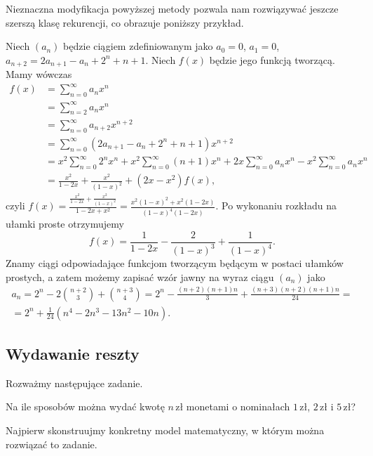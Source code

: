 \documentclass[shortabstract]{imthesis}
\begin{document}
    Nieznaczna modyfikacja powyższej metody pozwala nam rozwiązywać jeszcze szerszą klasę rekurencji, co obrazuje poniższy przykład.
    \begin{example}
        Niech $(a_n)$ będzie ciągiem zdefiniowanym jako $a_0 = 0$, $a_1 = 0$, $a_{n+2} = 2a_{n+1} - a_n + 2^n + n+1$. Niech $f(x)$ będzie jego funkcją tworzącą. Mamy wówczas
        \begin{align*}
        f(x) &= \sum_{n=0}^\infty a_nx^n \\
        &= \sum_{n=2}^\infty a_nx^n \\
        &= \sum_{n=0}^\infty a_{n+2}x^{n+2} \\
        &= \sum_{n=0}^\infty (2a_{n+1} - a_n + 2^n + n+1)x^{n+2} \\
        &= x^2\sum_{n=0}^\infty 2^nx^n + x^2\sum_{n=0}^\infty (n+1)x^n + 2x\sum_{n=0}^\infty a_nx^n - x^2\sum_{n=0}^\infty a_nx^n \\
        &= \frac{x^2}{1-2x} + \frac{x^2}{(1-x)^2} + (2x-x^2)f(x),
    \end{align*}
    czyli $f(x) = \frac{\frac{x^2}{1-2x} + \frac{x^2}{(1-x)^2}}{1-2x+x^2} = \frac{x^2(1-x)^2 + x^2(1-2x)}{(1-x)^4(1-2x)}$. Po wykonaniu rozkładu na ułamki proste otrzymujemy
    $$
    f(x) = \frac{1}{1-2x} - \frac{2}{(1-x)^3} + \frac{1}{(1-x)^4}.
    $$
    Znamy ciągi odpowiadające funkcjom tworzącym będącym w postaci ułamków prostych, a zatem możemy zapisać wzór jawny na wyraz ciągu $(a_n)$ jako
    \begin{gather*}
    a_n = 2^n - 2{n+2 \choose 3} + {n+3 \choose 4} = 2^n - \frac{(n+2)(n+1)n}{3} + \frac{(n+3)(n+2)(n+1)n}{24} = \\
    = 2^n + \frac{1}{24} (n^4 - 2 n^3 - 13 n^2 - 10n).
    \end{gather*}
    \end{example}
    
\subsection{Wydawanie reszty}

    Rozważmy następujące zadanie.
    \begin{problem} \label{problem:monety1}
        Na ile sposobów można wydać kwotę $n\,\text{zł}$ monetami o nominałach $1\,\text{zł}$, $2\,\text{zł}$ i $5\,\text{zł}$?
    \end{problem}

    Najpierw skonstruujmy konkretny model matematyczny, w którym można rozwiązać to zadanie.
\end{document}
